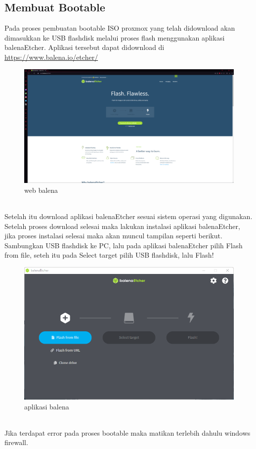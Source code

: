 \documentclass{article}
\begin{document}
  \newpage
  \subsection{Membuat Bootable}
  Pada proses pembuatan bootable ISO proxmox yang telah didownload akan dimasukkan ke USB flashdisk melalui proses flash menggunakan aplikasi balenaEtcher. 
  Aplikasi tersebut dapat didownload di \url{https://www.balena.io/etcher/}
  \begin{figure}[h!]
    \centering
    \includegraphics[width=0.9\linewidth]{balena web.png}
    \caption{web balena}
  \end{figure}
  \\ Setelah itu download aplikasi balenaEtcher sesuai sistem operasi yang digunakan. 
  Setelah proses download selesai maka lakukan instalasi aplikasi balenaEtcher,
  jika proses instalasi selesai maka akan muncul tampilan seperti berikut. Sambungkan USB flashdisk ke PC, 
  lalu pada aplikasi balenaEtcher pilih Flash from file,
  seteh itu pada Select target pilih USB flashdisk, lalu Flash!
  \begin{figure}[h!]
    \centering
    \includegraphics[width=0.75\linewidth]{balena.png}
    \caption{aplikasi balena}
  \end{figure}
  \\ Jika terdapat error pada proses bootable maka matikan terlebih dahulu windows firewall.
\end{document}
